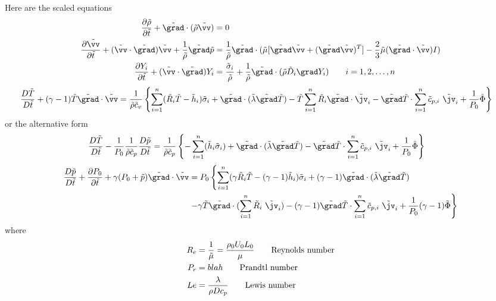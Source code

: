 \documentclass{article}
\begin{document}
Here are the scaled equations
\begin{align*}
   {\partial \rhot  \over \partial \ttt} + \gradt\cdot(\rhot \vvt)&=0 \\
   {\partial \vvt  \over \partial \ttt}  + (\vvt\cdot\gradt)\vvt +{1\over\rhot} \gradt \pt  
            & = {1\over\rhot} \gradt\cdot( \mut [\gradt \vvt + (\gradt\vvt)^T] -{2\over3}\mut (\gradt\cdot\vvt)I) \\
  {\partial Y_i \over \partial \ttt} + (\vvt\cdot\gradt) Y_i &= {\sigmat_i \over \rhot}
               +{1\over\rhot}\gradt\cdot(\rhot \Dt_i\grad Y_i) \qquad i=1,2,\ldots,n
\end{align*}
\begin{align*}
  {D \Tt\over D\ttt} + (\gamma-1)\Tt\gradt\cdot\vvt & = 
       {1\over \rhot \ct_v}  \left\{ \sumi  ( \Rt_i \Tt - \hht_i) \sigmat_i 
+ \gradt\cdot(\lambdat\gradt \Tt)
- \Tt \sumi  \Rt_i \gradt\cdot\jvt_i - \gradt \Tt \cdot\sumi \ct_{p,i} ~\jvt_i
              + {1\over P_0} \Phit \right\} 
\end{align*}
or the alternative form
\begin{align*}
  {D \Tt\over D\ttt} - {1\over P_0} {1\over \rhot \ct_p} {D \pt\over D\ttt} & = 
       {1\over \rhot \ct_p}  \left\{ -\sumi (\hht_i\sigmat_i) + \gradt\cdot(\lambdat\gradt \Tt)
       - \gradt \Tt \cdot\sumi \ct_{p,i}  ~\jvt_i
               + {1\over P_0} \Phit \right\} 
\end{align*}
\begin{align*}
     {D \pt\over D\ttt}+ {\partial P_0 \over \partial \ttt} + \gamma (P_0 + \pt) \gradt\cdot\vvt &= 
    P_0 \left\{ \sumi  ({\gamma \Rt_i} \Tt - (\gamma-1) \hht_i) \sigmat_i 
        + (\gamma-1) \gradt\cdot(\lambdat\gradt \Tt) \right. \\
    &  \left. - \gamma \Tt \gradt\cdot( \sumi \Rt_i~\jvt_i) - (\gamma-1)\gradt \Tt\cdot\sumi \ct_{p,i}~\jvt_i
              + {1\over P_0} (\gamma-1) \Phit \right\}
\end{align*}
where
\begin{align*}
  R_e &= {1\over \tilde{\mu}} = {\rho_0 U_0 L_0 \over \mu}  \qquad \text{Reynolds number} \\
  P_r & =     blah                   \qquad \text{Prandtl number} \\
  Le & = {\lambda \over \rho D c_p } \qquad \text{Lewis number}
\end{align*}
\end{document}
